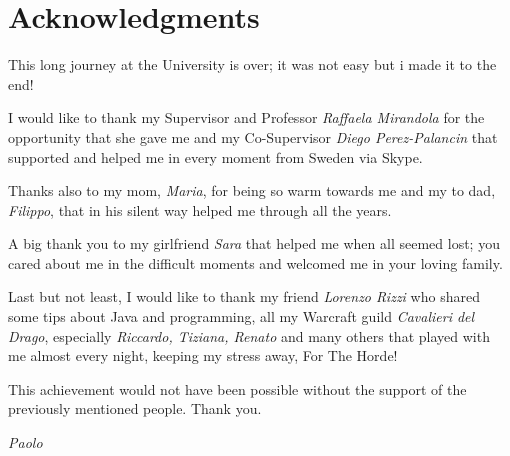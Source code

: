 \chapter*{Acknowledgments}

This long journey at the University is over; it was not easy but i made it to the end!

\vspace{0.5cm}

I would like to thank my Supervisor and Professor \emph{Raffaela Mirandola} for the opportunity that she gave me and my Co-Supervisor \emph{Diego Perez-Palancin} that supported and helped me in every moment from Sweden via Skype.

\vspace{0.5cm}

Thanks also to my mom, \emph{Maria}, for being so warm towards me and my to dad, \emph{Filippo}, that in his silent way helped me through all the years.

\vspace{0.5cm}

A big thank you to my girlfriend \emph{Sara} that helped me when all seemed lost; you cared about me in the difficult moments and welcomed me in your loving family.

\vspace{0.5cm}

Last but not least, I would like to thank my friend \emph{Lorenzo Rizzi} who shared some tips about Java and programming, all my Warcraft guild \emph{Cavalieri del Drago}, especially \emph{Riccardo, Tiziana, Renato} and many others that played with me almost every night, keeping my stress away, For The Horde!

\vspace{0.5cm}

This achievement would not have been possible without the support of the previously mentioned people. Thank you.

\begin{flushright}
	\emph{Paolo}
\end{flushright}
